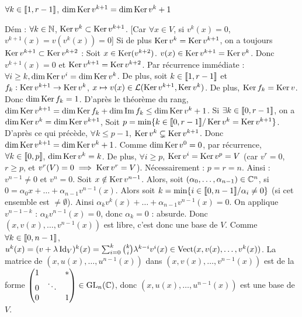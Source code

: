 \begin{solution}
\begin{lemma*}
$\forall k \in \llbracket 1,r-1\rrbracket$, $\dim \operatorname{Ker} v^{k+1} = \dim \operatorname{Ker} v^k + 1$
\end{lemma*}
Dém : $\forall k \in \mathbb N$, $\operatorname{Ker} v^k \subset \operatorname{Ker} v^{k+1}$.
[Car $\forall x \in V$, si $v^k(x) = 0$, $v^{k+1}(x) = v(v^k(x)) = 0$]
Si de plus $\operatorname{Ker} v^k = \operatorname{Ker} v^{k+1}$, on a toujours $\operatorname{Ker} v^{k+1} \subset \operatorname{Ker} v^{k+2}$ :
Soit $x \in \operatorname{Ker}(v^{k+2})$.
$v(x) \in \operatorname{Ker} v^{k+1} = \operatorname{Ker} v^k$. Donc $v^{k+1}(x) = 0$
et $\operatorname{Ker} v^{k+1} = \operatorname{Ker} v^{k+2}$.
Par récurrence immédiate :
$\forall i \geq k, \dim \operatorname{Ker} v^i = \dim \operatorname{Ker} v^k$.
De plus, soit $k \in \llbracket 1,r-1\rrbracket$ et $f_k : \operatorname{Ker} v^{k+1} \to \operatorname{Ker} v^k$, $x \mapsto v(x) \in \mathcal L(\operatorname{Ker} v^{k+1}, \operatorname{Ker} v^k)$.
De plus, $\operatorname{Ker} f_k = \operatorname{Ker} v$. Donc $\dim \operatorname{Ker} f_k = 1$.
D'après le théorème du rang, $\dim \operatorname{Ker} v^{k+1} = \dim \operatorname{Ker} f_k + \dim \operatorname{Im} f_k \leq \dim \operatorname{Ker} v^k + 1$.
Si $\exists k \in \llbracket 0,r-1\rrbracket$, on a $\dim \operatorname{Ker} v^k = \dim \operatorname{Ker} v^{k+1}$,
Soit $p = \min \{k \in \llbracket 0,r-1\rrbracket / \operatorname{Ker} v^k = \operatorname{Ker} v^{k+1}\}$.
D'après ce qui précède, $\forall k \leq p-1$, $\operatorname{Ker} v^k \subsetneq \operatorname{Ker} v^{k+1}$.
Donc $\dim \operatorname{Ker} v^{k+1} = \dim \operatorname{Ker} v^k + 1$.
Comme $\dim \operatorname{Ker} v^0 = 0$, par récurrence, $\forall k \in \llbracket 0,p\rrbracket$, $\dim \operatorname{Ker} v^k = k$.
De plus, $\forall i \geq p$, $\operatorname{Ker} v^i = \operatorname{Ker} v^p = V$ (car $v^r = 0$, $r \geq p$, et $v^r(V) = 0 \implies \operatorname{Ker} v^r = V$).
Nécessairement : $p = r = n$.
Ainsi : $v^{n-1} \neq 0$ et $v^n = 0$.
Soit $x \notin \operatorname{Ker} v^{n-1}$.
Alors, soit $(\alpha_0, \dots, \alpha_{n-1}) \in \mathbb C^n$, si $0 = \alpha_0 x + \dots + \alpha_{n-1} v^{n-1}(x)$.
Alors soit $k = \min \{i \in \llbracket 0,n-1\rrbracket / \alpha_i \neq 0\}$ (si cet ensemble est $\neq \emptyset$).
Ainsi $\alpha_k v^k(x) + \dots + \alpha_{n-1} v^{n-1}(x) = 0$.
On applique $v^{n-1-k}$ :
$\alpha_k v^{n-1}(x) = 0$, donc $\alpha_k = 0$ : absurde.
Donc $(x, v(x), \dots, v^{n-1}(x))$ est libre, c'est donc une base de $V$.
Comme $\forall k \in \llbracket 0,n-1\rrbracket$, $u^k(x) = (v + \lambda \operatorname{Id}_V)^k(x) = \sum_{i=0}^k \binom{k}{i} \lambda^{k-i} v^i(x) \in \operatorname{Vect}(x, v(x), \dots, v^k(x))$.
La matrice de $(x, u(x), \dots, u^{n-1}(x))$ dans $(x, v(x), \dots, v^{n-1}(x))$ est de la forme
$\begin{pmatrix} 1 & & * \\ 0 & \ddots & \\ 0 & & 1 \end{pmatrix} \in \operatorname{GL}_n(\mathbb C)$, donc $(x, u(x), \dots, u^{n-1}(x))$ est une base de $V$.


\end{solution}
